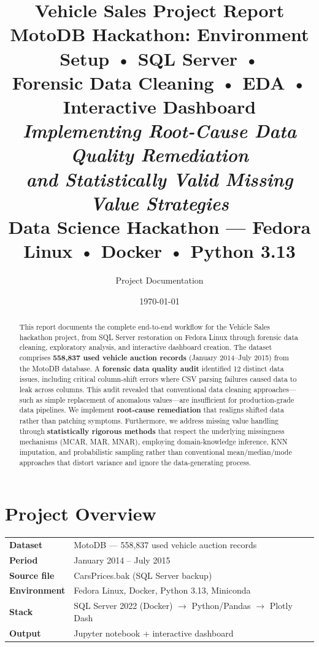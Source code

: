 \documentclass[12pt,a4paper]{article}
\title{\vspace{-2cm}
\textbf{\Huge Vehicle Sales Project Report}\\[0.3cm]
\Large MotoDB Hackathon: Environment Setup • SQL Server •\\
Forensic Data Cleaning • EDA • Interactive Dashboard\\[0.5cm]
\large \textit{Implementing Root-Cause Data Quality Remediation\\
and Statistically Valid Missing Value Strategies}\\[1cm]
\normalsize Data Science Hackathon --- Fedora Linux • Docker • Python 3.13}
\author{Project Documentation}
\date{\today}
\begin{document}
\maketitle
\thispagestyle{empty}

\vspace{0.5cm}

\begin{abstract}
\noindent
This report documents the complete end-to-end workflow for the Vehicle Sales hackathon project, from SQL Server restoration on Fedora Linux through forensic data cleaning, exploratory analysis, and interactive dashboard creation. The dataset comprises \textbf{558,837 used vehicle auction records} (January 2014--July 2015) from the MotoDB database. A \textbf{forensic data quality audit} identified 12 distinct data issues, including critical column-shift errors where CSV parsing failures caused data to leak across columns. This audit revealed that conventional data cleaning approaches---such as simple replacement of anomalous values---are insufficient for production-grade data pipelines. We implement \textbf{root-cause remediation} that realigns shifted data rather than patching symptoms. Furthermore, we address missing value handling through \textbf{statistically rigorous methods} that respect the underlying missingness mechanisms (MCAR, MAR, MNAR), employing domain-knowledge inference, KNN imputation, and probabilistic sampling rather than conventional mean/median/mode approaches that distort variance and ignore the data-generating process.
\end{abstract}

\tableofcontents
\newpage

\section{Project Overview}

\begin{center}
\begin{tabular}{ll}
\toprule
\textbf{Dataset} & MotoDB --- 558,837 used vehicle auction records \\
\textbf{Period} & January 2014 -- July 2015 \\
\textbf{Source file} & CarsPrices.bak (SQL Server backup) \\
\textbf{Environment} & Fedora Linux, Docker, Python 3.13, Miniconda \\
\textbf{Stack} & SQL Server 2022 (Docker) $\rightarrow$ Python/Pandas $\rightarrow$ Plotly Dash \\
\textbf{Output} & Jupyter notebook + interactive dashboard \\
\bottomrule
\end{tabular}
\end{center}
\end{document}
